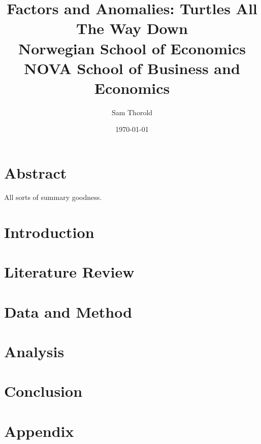 \documentclass[12pt]{report}
\title{
  {Factors and Anomalies: Turtles All The Way Down}\\
  {\large Norwegian School of Economics}\\
  {\large NOVA School of Business and Economics}
}
\author{Sam Thorold}
\date{\today}
\begin{document}
\maketitle

\chapter*{Abstract}

All sorts of summary goodness.

\tableofcontents

\chapter{Introduction} \label{sec:Intro}


\chapter{Literature Review} \label{sec:LitRev}


\chapter{Data and Method} \label{sec:DataMethod}


\chapter{Analysis} \label{sec:Analysis}


\chapter{Conclusion} \label{sec:Conclusion}


\appendix

\chapter{Appendix}


\printbibliography
\end{document}
